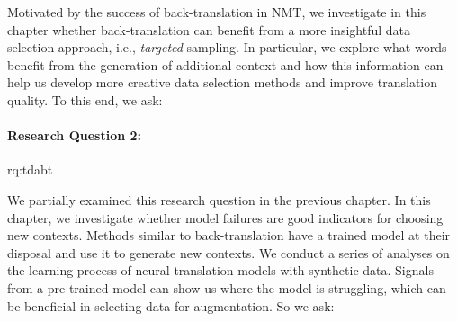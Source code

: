 Motivated by the success of back-translation in NMT, we investigate in this chapter whether back-translation can benefit from a more insightful data selection approach, i.e., \textit{targeted} sampling.
In particular, we explore what words benefit from the generation of additional context and how this information can help us develop more creative data selection methods and improve translation quality.
To this end, we ask: 

\paragraph{Research Question 2:} \acl{rq:tdabt} 

\medskip

 \noindent We partially examined this research question in the previous chapter. 
 In this chapter, we investigate whether model failures are good indicators for choosing new contexts.
 Methods similar to back-translation have a trained model at their disposal and use it to generate new contexts.
 We conduct a series of analyses on the learning process of neural translation models with synthetic data.
 Signals from a pre-trained model can show us where the model is struggling, which can be beneficial in selecting data for augmentation. 
 So we ask:
 
